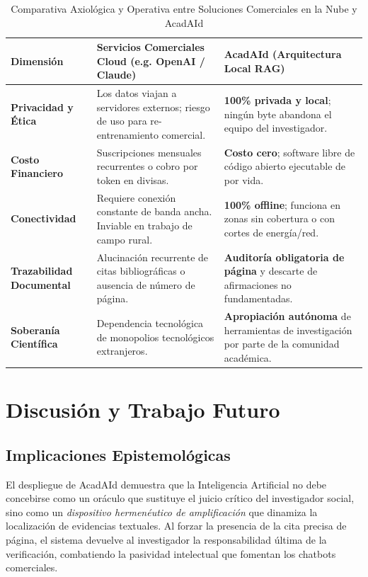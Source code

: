 \documentclass[12pt,a4paper]{article}
\begin{document}
\begin{table}[htbp]
\centering
\caption{Comparativa Axiológica y Operativa entre Soluciones Comerciales en la Nube y AcadAId}
\label{tab:comparativa}
\small
\begin{tabularx}{\textwidth}{>{\raggedright\arraybackslash}p{3.5cm} >{\raggedright\arraybackslash}X >{\raggedright\arraybackslash}X}
\toprule
\textbf{Dimensión} & \textbf{Servicios Comerciales Cloud (e.g. OpenAI / Claude)} & \textbf{AcadAId (Arquitectura Local RAG)} \\
\midrule
\textbf{Privacidad y Ética} & Los datos viajan a servidores externos; riesgo de uso para re-entrenamiento comercial. & \textbf{100\% privada y local}; ningún byte abandona el equipo del investigador. \\
\addlinespace
\textbf{Costo Financiero} & Suscripciones mensuales recurrentes o cobro por token en divisas. & \textbf{Costo cero}; software libre de código abierto ejecutable de por vida. \\
\addlinespace
\textbf{Conectividad} & Requiere conexión constante de banda ancha. Inviable en trabajo de campo rural. & \textbf{100\% offline}; funciona en zonas sin cobertura o con cortes de energía/red. \\
\addlinespace
\textbf{Trazabilidad Documental} & Alucinación recurrente de citas bibliográficas o ausencia de número de página. & \textbf{Auditoría obligatoria de página} y descarte de afirmaciones no fundamentadas. \\
\addlinespace
\textbf{Soberanía Científica} & Dependencia tecnológica de monopolios tecnológicos extranjeros. & \textbf{Apropiación autónoma} de herramientas de investigación por parte de la comunidad académica. \\
\bottomrule
\end{tabularx}
\end{table}

\section{Discusión y Trabajo Futuro}
\label{sec:discusion}

\subsection{Implicaciones Epistemológicas}
El despliegue de AcadAId demuestra que la Inteligencia Artificial no debe concebirse como un oráculo que sustituye el juicio crítico del investigador social, sino como un \textit{dispositivo hermenéutico de amplificación} que dinamiza la localización de evidencias textuales. Al forzar la presencia de la cita precisa de página, el sistema devuelve al investigador la responsabilidad última de la verificación, combatiendo la pasividad intelectual que fomentan los chatbots comerciales.
\end{document}
